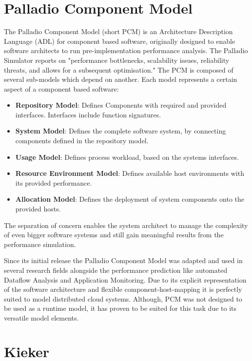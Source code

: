 \section{Palladio Component Model}
\label{sec:Foundations:pcm}

The Palladio Component Model (short PCM) is an Architecture Description Language (ADL) for component based software, originally designed to enable software architects to run pre-implementation performance analysis. The Palladio Simulator reports on "performance bottlenecks, scalability issues, reliability threats, and allows for a subsequent optimisation." The PCM is composed of several sub-models which depend on another. Each model represents a certain aspect of a component based software:

\begin{itemize}
	\setlength\itemsep{0em}
	\item \textbf{Repository Model}: Defines Components with required and provided interfaces. Interfaces include function signatures. 
	\item \textbf{System Model}: Defines the complete software system, by connecting components defined in the repository model.
	\item \textbf{Usage Model}: Defines process workload, based on the systems interfaces.
	\item \textbf{Resource Environment Model}: Defines available host environments with its provided performance.
	\item \textbf{Allocation Model}: Defines the deployment of system components onto the provided hosts.
\end{itemize}

The separation of concern enables the system architect to manage the complexity of even bigger software systems and still gain meaningful results from the performance simulation.

Since its initial release the Palladio Component Model was adapted and used in several research fields alongside the performance prediction like automated Dataflow Analysis and Application Monitoring. Due to its explicit representation of the software architecture and flexible component-host-mapping it is perfectly suited to model distributed cloud systems. Although, PCM was not designed to be used as a runtime model, it has proven to be suited for this task due to its versatile model elements.

\section{Kieker}
\label{sec:Foundations:Kieker}

